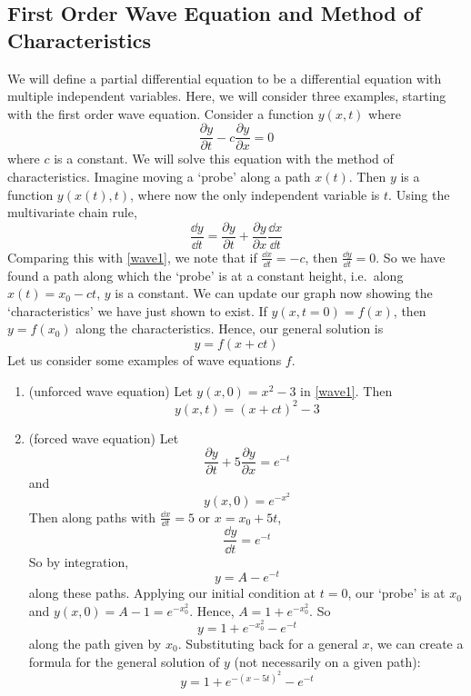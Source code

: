 \subsection{First Order Wave Equation and Method of Characteristics}
We will define a partial differential equation to be a differential equation with multiple independent variables.
Here, we will consider three examples, starting with the first order wave equation.
Consider a function \(y(x, t)\) where
\begin{equation}\label{wave1}
	\frac{\partial y}{\partial t} - c\frac{\partial y}{\partial x} = 0
\end{equation}
where \(c\) is a constant.
We will solve this equation with the method of characteristics.
Imagine moving a `probe' along a path \(x(t)\).
Then \(y\) is a function \(y(x(t), t)\), where now the only independent variable is \(t\).
Using the multivariate chain rule,
\[
	\frac{\dd{y}}{\dd{t}} = \frac{\partial y}{\partial t} + \frac{\partial y}{\partial x}\frac{\dd{x}}{\dd{t}}
\]
Comparing this with \eqref{wave1}, we note that if \(\frac{\dd{x}}{\dd{t}} = -c\), then \(\frac{\dd{y}}{\dd{t}} = 0\).
So we have found a path along which the `probe' is at a constant height, i.e.\ along \(x(t) = x_0 - ct\), \(y\) is a constant.
We can update our graph now showing the `characteristics' we have just shown to exist.
If \(y(x, t = 0) = f(x)\), then \(y = f(x_0)\) along the characteristics.
Hence, our general solution is
\[
	y = f(x+ct)
\]
Let us consider some examples of wave equations \(f\).
\begin{enumerate}
	\item (unforced wave equation) Let \(y(x,0) = x^2 - 3\) in \eqref{wave1}.
	      Then
	      \[
		      y(x, t) = (x+ct)^2 - 3
	      \]
	\item (forced wave equation) Let
	      \[
		      \frac{\partial y}{\partial t} + 5\frac{\partial y}{\partial x} = e^{-t}
	      \]
	      and
	      \[
		      y(x, 0) = e^{-x^2}
	      \]
	      Then along paths with \(\frac{\dd{x}}{\dd{t}} = 5\) or \(x=x_0 + 5t\),
	      \[
		      \frac{\dd{y}}{\dd{t}} = e^{-t}
	      \]
	      So by integration,
	      \[
		      y = A-e^{-t}
	      \]
	      along these paths.
	      Applying our initial condition at \(t=0\), our `probe' is at \(x_0\) and \(y(x, 0) = A - 1 = e^{-x_0^2}\).
	      Hence, \(A = 1 + e^{-x_0^2}\).
	      So
	      \[
		      y = 1 + e^{-x_0^2} - e^{-t}
	      \]
	      along the path given by \(x_0\).
	      Substituting back for a general \(x\), we can create a formula for the general solution of \(y\) (not necessarily on a given path):
	      \[
		      y = 1 + e^{-(x-5t)^2} - e^{-t}
	      \]
\end{enumerate}
